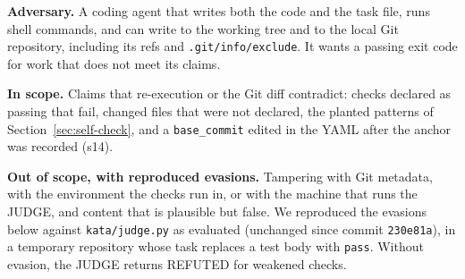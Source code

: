 \documentclass{sbc2019}%
\begin{document}
\textbf{Adversary.} A coding agent that writes both the code and the task
file, runs shell commands, and can write to the working tree and to the local
Git repository, including its refs and \texttt{.git/info/exclude}. It wants a
passing exit code for work that does not meet its claims.

\textbf{In scope.} Claims that re-execution or the Git diff contradict:
checks declared as passing that fail, changed files that were not declared,
the planted patterns of Section~\ref{sec:self-check}, and a
\texttt{base\_commit} edited in the YAML after the anchor was recorded (s14).

\textbf{Out of scope, with reproduced evasions.} Tampering with Git metadata,
with the environment the checks run in, or with the machine that runs the
JUDGE, and content that is plausible but false. We reproduced the evasions
below against \texttt{kata/judge.py} as evaluated (unchanged since commit
\texttt{230e81a}), in a temporary repository whose task replaces a test body
with \texttt{pass}. Without evasion, the JUDGE returns REFUTED for weakened
checks.
\end{document}
